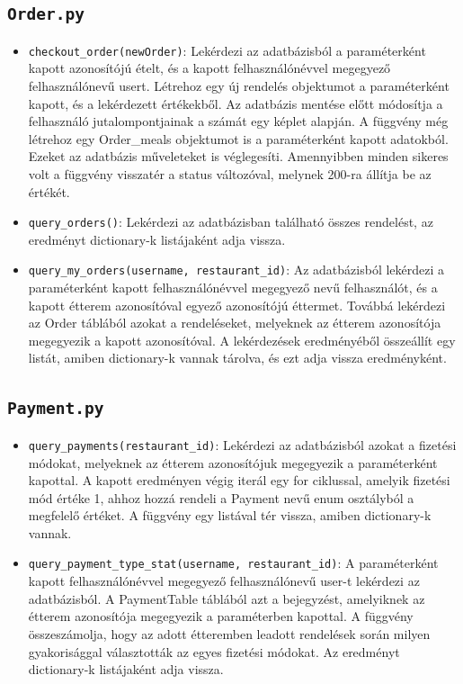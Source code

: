 \subsection{\texttt{Order.py}}

\begin{itemize}
\item \texttt{checkout\_order(newOrder)}:
Lekérdezi az adatbázisból a paraméterként kapott azonosítójú ételt, és a kapott felhasználónévvel megegyező felhasználónevű usert. Létrehoz egy új rendelés objektumot a paraméterként kapott, és a lekérdezett értékekből. Az adatbázis mentése előtt módosítja a felhasználó jutalompontjainak a számát egy képlet alapján. A függvény még létrehoz egy Order\_meals objektumot is a paraméterként kapott adatokból. Ezeket az adatbázis műveleteket is véglegesíti. Amennyibben minden sikeres volt a függvény visszatér a status változóval, melynek 200-ra állítja be az értékét.
\item \texttt{query\_orders()}:
Lekérdezi az adatbázisban található összes rendelést, az eredményt dictionary-k listájaként adja vissza.
\item \texttt{query\_my\_orders(username, restaurant\_id)}:
Az adatbázisból lekérdezi a paraméterként kapott felhasználónévvel megegyező nevű felhasználót, és a kapott étterem azonosítóval egyező azonosítójú éttermet. Továbbá lekérdezi az Order táblából azokat a rendeléseket, melyeknek az étterem azonosítója megegyezik a kapott azonosítóval. A lekérdezések eredményéből összeállít egy listát, amiben dictionary-k vannak tárolva, és ezt adja vissza eredményként.
\end{itemize}

\subsection{\texttt{Payment.py}}

\begin{itemize}
\item \texttt{query\_payments(restaurant\_id)}:
Lekérdezi az adatbázisból azokat a fizetési módokat, melyeknek az étterem azonosítójuk megegyezik a paraméterként kapottal. A kapott eredményen végig iterál egy for ciklussal, amelyik fizetési mód értéke 1, ahhoz hozzá rendeli a Payment nevű enum osztályból a megfelelő értéket. A függvény egy listával tér vissza, amiben dictionary-k vannak.
\item \texttt{query\_payment\_type\_stat(username, restaurant\_id)}: 
A paraméterként kapott felhasználónévvel megegyező felhasználónevű user-t lekérdezi az adatbázisból. A PaymentTable táblából azt a bejegyzést, amelyiknek az étterem azonosítója megegyezik a paraméterben kapottal. A függvény összeszámolja, hogy az adott étteremben leadott rendelések során milyen gyakorisággal választották az egyes fizetési módokat. Az eredményt dictionary-k listájaként adja vissza.
\end{itemize}

